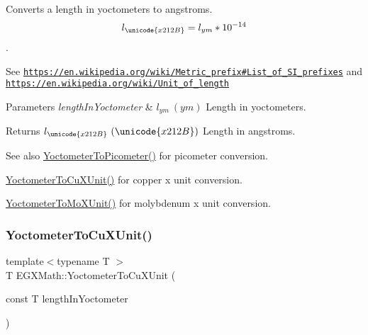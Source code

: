 Converts a length in yoctometers to angstroms. \[ l_{\unicode{x212B}}=l_{ym} * 10^{-14} \]. 

See \href{https://en.wikipedia.org/wiki/Metric_prefix#List_of_SI_prefixes}{\tt https\+://en.\+wikipedia.\+org/wiki/\+Metric\+\_\+prefix\#\+List\+\_\+of\+\_\+\+S\+I\+\_\+prefixes} and \href{https://en.wikipedia.org/wiki/Unit_of_length}{\tt https\+://en.\+wikipedia.\+org/wiki/\+Unit\+\_\+of\+\_\+length} 
\begin{DoxyParams}{Parameters}
{\em length\+In\+Yoctometer} & $ l_{ym}\ (ym)$ Length in yoctometers. \\
\hline
\end{DoxyParams}
\begin{DoxyReturn}{Returns}
$ l_{\unicode{x212B}}\ (\unicode{x212B})$ Length in angstroms. 
\end{DoxyReturn}
\begin{DoxySeeAlso}{See also}
\mbox{\hyperlink{group___e_g_x_math-_conversions-_length_conversions-_s_i-_yoctometer-_s_i_gab621b78b78d6776131912bd6038901b9}{Yoctometer\+To\+Picometer()}} for picometer conversion. 

\mbox{\hyperlink{group___e_g_x_math-_conversions-_length_conversions-_s_i-_yoctometer-_non-_s_i_ga0266faf325ea86fef13391fb6e792ff8}{Yoctometer\+To\+Cu\+X\+Unit()}} for copper x unit conversion. 

\mbox{\hyperlink{group___e_g_x_math-_conversions-_length_conversions-_s_i-_yoctometer-_non-_s_i_ga6a6a1fb3ecc97e377fc728c03327048e}{Yoctometer\+To\+Mo\+X\+Unit()}} for molybdenum x unit conversion. 
\end{DoxySeeAlso}
\mbox{\label{group___e_g_x_math-_conversions-_length_conversions-_s_i-_yoctometer-_non-_s_i_ga0266faf325ea86fef13391fb6e792ff8}} 
\subsubsection{\texorpdfstring{Yoctometer\+To\+Cu\+X\+Unit()}{YoctometerToCuXUnit()}}
{\footnotesize\ttfamily template$<$typename T $>$ \\
T E\+G\+X\+Math\+::\+Yoctometer\+To\+Cu\+X\+Unit (\begin{DoxyParamCaption}\item[{const T}]{length\+In\+Yoctometer }\end{DoxyParamCaption})}



